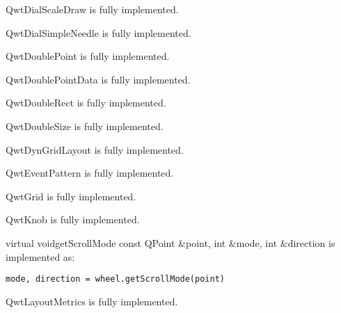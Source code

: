 \documentclass{manual}
\begin{document}
\begin{classdesc*}{QwtDialScaleDraw}
  is fully implemented.
\end{classdesc*}

\begin{classdesc*}{QwtDialSimpleNeedle}
  is fully implemented.
\end{classdesc*}

\begin{classdesc*}{QwtDoublePoint}
  is fully implemented.
\end{classdesc*}

\begin{classdesc*}{QwtDoublePointData}
  is fully implemented.
\end{classdesc*}

\begin{classdesc*}{QwtDoubleRect}
  is fully implemented.
\end{classdesc*}

\begin{classdesc*}{QwtDoubleSize}
  is fully implemented.
\end{classdesc*}

\begin{classdesc*}{QwtDynGridLayout}
  is fully implemented.
\end{classdesc*}

\begin{classdesc*}{QwtEventPattern}
  is fully implemented.
\end{classdesc*}

\begin{classdesc*}{QwtGrid}
  is fully implemented.
\end{classdesc*}

\begin{classdesc*}{QwtKnob}
  is fully implemented.

  \begin{cfuncdesc}{virtual void}{getScrollMode}{
      const QPoint \&point, int \&mode, int \&direction}
    is implemented as:
    \begin{verbatim}
mode, direction = wheel.getScrollMode(point)
    \end{verbatim}    
  \end{cfuncdesc}

\end{classdesc*}

\begin{classdesc*}{QwtLayoutMetrics}
  is fully implemented.
\end{classdesc*}
\end{document}
